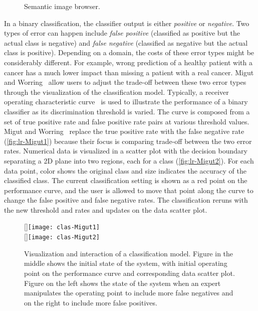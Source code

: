 \begin{figure}[!htb]
\centering
{} 
\hfill
{} 
\label{fig:lr-SIB}
\caption{Semantic image browser. }
\end{figure}

In a binary classification, the classifier output is either \emph{positive} or \emph{negative}. Two types of error can happen include \emph{false positive} (classified as positive but the actual class is negative) and \emph{false negative} (classified as negative but the actual class is positive). Depending on a domain, the costs of these error types might be considerably different. For example, wrong prediction of a healthy patient with a cancer has a much lower impact than missing a patient with a real cancer. Migut and Worring~\cite{Migut2010} allow users to adjust the trade-off between these two error types through the visualization of the classification model. Typically, a receiver operating characteristic curve~\cite{Fawcett2006} is used to illustrate the performance of a binary classifier as its discrimination threshold is varied. The curve is composed from a set of true positive rate and false positive rate pairs at various threshold values. Migut and Worring~\cite{Migut2010} replace the true positive rate with the false negative rate (\autoref{fig:lr-Migut1}) because their focus is comparing trade-off between the two error rates. Numerical data is visualized in a scatter plot with the decision boundary separating a 2D plane into two regions, each for a class (\autoref{fig:lr-Migut2}). For each data point, color shows the original class and size indicates the accuracy of the classified class. The current classification setting is shown as a red point on the performance curve, and the user is allowed to move that point along the curve to change the false positive and false negative rates. The classification reruns with the new threshold and rates and updates on the data scatter plot.

\begin{figure}[!htb]
\centering
{}[\columnwidth]{\texttt{[image: clas-Migut1]}} 
\\
[\columnwidth]{\texttt{[image: clas-Migut2]}}
\caption{Visualization and interaction of a classification model. Figure in the middle shows the initial state of the system, with initial operating point on the performance curve and corresponding data scatter plot. Figure on the left shows the state of the system when an expert manipulates the operating point to include more false negatives and on the right to include more false positives. }
\end{figure}

